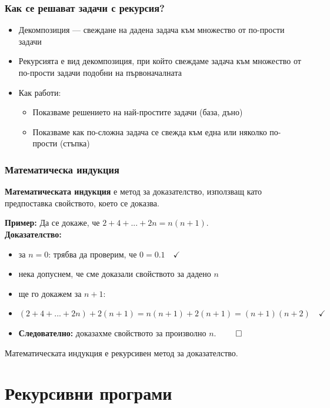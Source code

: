 \documentclass[alsotrans]{beamerswitch}
\begin{document}
\begin{frame}
  \frametitle{Как се решават задачи с рекурсия?}

  \begin{itemize}[<+->]
  \item \alert{Декомпозиция} --- свеждане на дадена задача към множество от по-прости задачи
  \item Рекурсията е вид декомпозиция, при който свеждаме задача към множество от по-прости задачи \alert{подобни на първоначалната}
  \item Как работи:
    \begin{itemize}
    \item Показваме решението на най-простите задачи \alert{(база, дъно)}
    \item Показваме как по-сложна задача се свежда към една или няколко по-прости \alert{(стъпка)}
    \end{itemize}
  \end{itemize}
\end{frame}

\begin{frame}
  \frametitle{Математическа индукция}

  \begin{definition}
    \textbf{Математическата индукция} е метод за доказателство, използващ като предпоставка свойството, което се доказва.
  \end{definition}
  \pause
  \textbf{Пример:} Да се докаже, че $2 + 4 + ... + 2n = n(n+1)$.\\[1em]
  \pause
  \textbf{Доказателство:}
  \begin{itemize}[<+->]
  \item за $n = 0$: трябва да проверим, че $0 = 0.1\quad\checkmark$
  \item нека допуснем, че сме доказали свойството за дадено $n$
  \item ще го докажем за $n+1$:
  \item $(2 + 4 + ... + 2n) + 2(n+1) = n(n+1) + 2(n+1) = (n+1)(n+2)\quad\checkmark$
  \item \textbf{Следователно:} доказахме свойството за произволно $n$. $\qed$
  \end{itemize}
  \onslide<+->
  Математическата индукция е рекурсивен метод за доказателство.
\end{frame}

\section{Рекурсивни програми}
\end{document}
